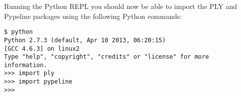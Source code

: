 Running the Python REPL you should now be able to import the PLY and Pypeline packages using the following Python commands:
\begin{verbatim}
$ python
Python 2.7.3 (default, Apr 10 2013, 06:20:15) 
[GCC 4.6.3] on linux2
Type "help", "copyright", "credits" or "license" for more
information.
>>> import ply
>>> import pypeline
>>> 
\end{verbatim}
